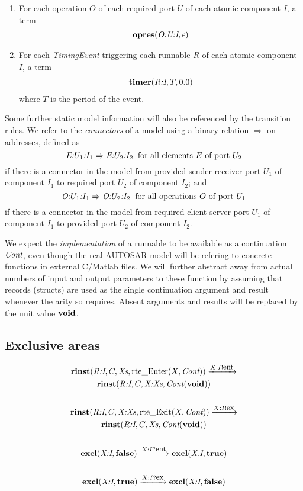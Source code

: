\documentclass[twocolumn]{article}
\newcommand{\V}[1]{\mbox{\it #1}}
\newcommand{\Cont}{\V{Cont}}
\newcommand{\Xs}{\V{Xs}}
\newcommand{\void}{\mbox{\bf void}}
\newcommand{\true}{\mbox{\bf true}}
\newcommand{\false}{\mbox{\bf false}}
\newcommand{\adr}[1]{\mbox{\em #1}}
\newcommand{\rinst}[4]{\mbox{\bf rinst}(#1,#2,#3,#4)}
\newcommand{\excl}[2]{\mbox{\bf excl}(#1,#2)}
\newcommand{\opres}[2]{\mbox{\bf opres}(#1,#2)}
\newcommand{\timer}[3]{\mbox{\bf timer}(#1,#2, #3)}
\newcommand{\Enter}[2]{\mbox{rte\_Enter}(#1,#2)}
\newcommand{\Exit}[2]{\mbox{rte\_Exit}(#1,#2)}
\newcommand{\red}[1]{\xrightarrow{#1}}
\newcommand{\say}[2]{#1 ! #2}
\newcommand{\hear}[2]{#1 ? #2}
\newcommand{\ent}{\mbox{\small ent}}
\newcommand{\ex}{\mbox{\small ex}}
\begin{document}
\begin{enumerate}
\item For each operation $O$ of each required port $U$ of each atomic component $I$, a term
$$
\begin{array}{c}
	\opres{\adr{O:U:I}}{\epsilon}
\end{array}
$$

\item For each {\em TimingEvent} triggering each runnable $R$ of each atomic component $I$, a term
$$
\begin{array}{c}
	\timer{\adr{R:I}}{T}{0.0}
\end{array}
$$
where $T$ is the period of the event.

\end{enumerate}

Some further static model information will also be referenced by the transition rules. We refer to the {\em connectors} of a model using a binary relation $\Rightarrow$ on addresses, defined as
$$
	\adr{E:$U_1$:$I_1$} \Rightarrow \adr{E:$U_2$:$I_2$} \;\;\mbox{for all elements $E$ of port $U_2$}
$$
if there is a connector in the model from provided sender-receiver port $U_1$ of component $I_1$ to required port $U_2$ of component $I_2$; and
$$
	\adr{O:$U_1$:$I_1$} \Rightarrow \adr{O:$U_2$:$I_2$} \;\;\mbox{for all operations $O$ of port $U_1$}
$$
if there is a connector in the model from required client-server port $U_1$ of component $I_1$ to provided port $U_2$ of component $I_2$.

We expect the {\em implementation} of a runnable to be available as a continuation $\Cont$, even though the real AUTOSAR model will be refering to concrete functions in external C/Matlab files. We will further abstract away from actual numbers of input and output parameters to these function by assuming that records (structs) are used as the single continuation argument and result whenever the arity so requires. Absent arguments and results will be replaced by the unit value $\void$. 

\subsection{Exclusive areas}

\begin{gather*}
	\rinst{\adr{R:I}}{C}{\Xs}{\Enter{X}{\Cont}}  \red{\say{X:I}{\ent}}  \\
		\rinst{\adr{R:I}}{C}{\adr{X:Xs}}{\Cont(\void)} \\
	\\
	\rinst{\adr{R:I}}{C}{\adr{X:Xs}}{\Exit{X}{\Cont}}  \red{\say{X:I}{\ex}}  \\
		\rinst{\adr{R:I}}{C}{\Xs}{\Cont(\void)} \\
	\\
	\excl{\adr{X:I}}{\false} \red{\hear{X:I}{\ent}} \excl{\adr{X:I}}{\true} \\
	\\
	\excl{\adr{X:I}}{\true} \red{\hear{X:I}{\ex}} \excl{\adr{X:I}}{\false} \\
	\\
\end{gather*}
\end{document}
